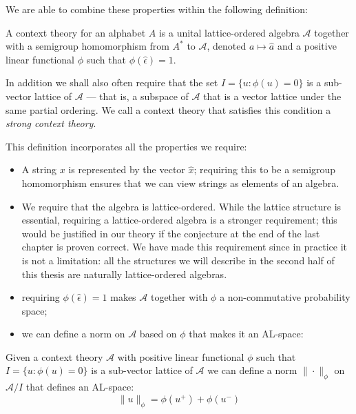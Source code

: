 We are able to combine these properties within the following definition:
\begin{defn}
A context theory for an alphabet $A$ is a unital lattice-ordered algebra $\mathcal{A}$ together with a semigroup homomorphism from $A^*$ to $\mathcal{A}$, denoted $a \mapsto \hat{a}$ and a positive linear functional $\phi$ such that $\phi(\hat{\epsilon}) = 1$.
\end{defn}
In addition we shall also often require that the set $I = \{u : \phi(u) = 0\}$ is a sub-vector lattice of $\mathcal{A}$ --- that is, a subspace of $\mathcal{A}$ that is a vector lattice under the same partial ordering. We call a context theory that satisfies this condition a \emph{strong context theory}.

This definition incorporates all the properties we require:
\begin{itemize}
\item A string $x$ is represented by the vector $\hat{x}$; requiring this to be a semigroup homomorphism ensures that we can view strings as elements of an algebra.
\item We require that the algebra is lattice-ordered. While the lattice structure is essential, requiring a lattice-ordered algebra is a stronger requirement; this would be justified in our theory if the conjecture at the end of the last chapter is proven correct. We have made this requirement since in practice it is not a limitation: all the structures we will describe in the second half of this thesis are naturally lattice-ordered algebras.
\item requiring $\phi(\hat{\epsilon}) = 1$  makes $\mathcal{A}$ together with $\phi$ a non-commutative probability space;
\item we can define a norm on $\mathcal{A}$ based on $\phi$ that makes it an AL-space:
\end{itemize}
\begin{prop}
Given a context theory $\mathcal{A}$ with positive linear functional $\phi$ such that  $I = \{u : \phi(u) = 0\}$ is a sub-vector lattice of $\mathcal{A}$ we can define a norm $\|\cdot\|_\phi$ on $\mathcal{A}/I$ that defines an AL-space:
$$\|u\|_\phi = \phi(u^+) + \phi(u^-)$$
\end{prop}
